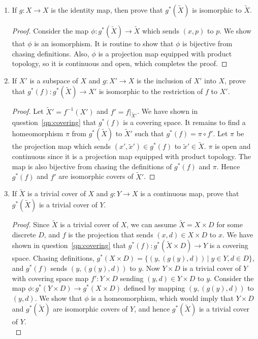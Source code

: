 \documentclass{article}
\begin{document}
\begin{enumerate}
\begin{enumerate}
      \item If $g:X\rightarrow X$ is the identity map, then prove that
        $g^*(\tilde{X})$ is isomorphic to $\tilde{X}$.
        \begin{proof}
          Consider the map $\phi:g^*(\tilde{X})\rightarrow\tilde{X}$ which
          sends $(x,p)$ to $p$. We show that $\phi$ is an isomorphism.
          It is routine to show that $\phi$ is bijective from chasing
          definitions. Also, $\phi$ is a projection map equipped with
          product topology, so it is continuous and open, which completes
          the proof.
        \end{proof}

      \item If $X'$ is a subspace of $X$ and $g:X'\rightarrow X$ is the
        inclusion of $X'$ into $X$, prove that
        $g^*(f):g^*(\tilde{X})\rightarrow X'$ is isomorphic to the
        restriction of $f$ to $X'$. \label{qn:subspace}

        \begin{proof}
          Let $\tilde{X}'=f^{-1}(X')$ and $f'=f|_{\tilde{X}'}$. We have
          shown in question~\ref{qn:covering} that $g^*(f)$ is a covering
          space. It remains to find a homeomorphism $\pi$ from
          $g^*(\tilde{X})$ to $\tilde{X}'$ such that $g^*(f)=\pi\circ f'$.
          Let $\pi$ be the projection map which sends $(x',\tilde{x}')\in
          g^*(f)$ to $\tilde{x}'\in\tilde{X}$. $\pi$ is open and continuous
          since it is a projection map equipped with product topology. The
          map is also bijective from chasing the definitions of $g^*(f)$
          and $\pi$. Hence $g^*(f)$ and $f'$ are isomorphic covers of
          $\tilde{X}'$.
        \end{proof}

      \item If $\tilde{X}$ is a trivial cover of $X$ and $g:Y\rightarrow X$
        is a continuous map, prove that $g^*(\tilde{X})$ is a trivial cover
        of $Y$. \label{qn:trivial}

        \begin{proof}
          Since $\tilde{X}$ is a trivial cover of $X$, we can assume
          $\tilde{X}=X\times D$ for some discrete $D$, and $f$ is the
          projection that sends $(x,d)\in X\times D$ to $x$. We have shown
          in question~\ref{qn:covering} that $g^*(f):g^*(\tilde{X}\times
          D)\rightarrow Y$ is a covering space. Chasing definitions,
          $g^*(X\times D)=\{(y,(g(y),d))\,|\; y\in Y, d\in D\}$, and
          $g^*(f)$ sends $(y,(g(y),d))$ to $y$. Now $Y\times D$ is a
          trivial cover of $Y$ with covering space map $f':Y\times D$
          sending $(y,d)\in Y\times D$ to $y$. Consider the map
          $\phi:g^*(Y\times D)\rightarrow g^*(X\times D)$ defined by
          mapping $(y,(g(y),d))$ to $(y,d)$. We show that $\phi$ is a
          homeomorphism, which would imply that $Y\times D$ and
          $g^*(\tilde{X})$ are isomorphic covers of $Y$, and hence
          $g^*(\tilde{X})$ is a trivial cover of $Y$. \\


\end{proof}
\end{enumerate}
\end{enumerate}
\end{document}
